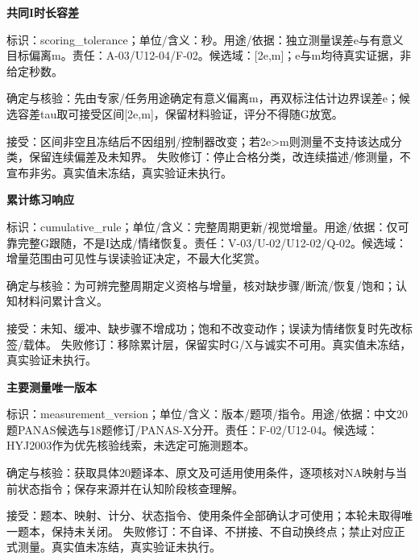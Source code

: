 \documentclass[11pt,a4paper]{article}
\newcommand{\reviewsubsection}[1]{\par\Needspace{4\baselineskip}\begin{center}{\titlelatin\titlecjk\bfseries\fontsize{12}{18}\selectfont #1}\end{center}}
\begin{document}
\begin{minipage}{\linewidth}
\reviewsubsection{8.14 共同I时长容差}
标识：scoring\_\allowbreak{}tolerance；单位/\allowbreak{}含义：秒。用途/\allowbreak{}依据：独立测量误差e与有意义目标偏离m。责任：A-\allowbreak{}03/\allowbreak{}U12-\allowbreak{}04/\allowbreak{}F-\allowbreak{}02。候选域：[2e,m]；e与m均待真实证据，非给定秒数。

确定与核验：先由专家/\allowbreak{}任务用途确定有意义偏离m，再双标注估计边界误差e；候选容差tau取可接受区间[2e,m]，保留材料验证，评分不得随G放宽。

接受：区间非空且冻结后不因组别/\allowbreak{}控制器改变；若2e>m则测量不支持该达成分类，保留连续偏差及未知界。 失败修订：停止合格分类，改连续描述/\allowbreak{}修测量，不宣布非劣。真实值未冻结，真实验证未执行。
\end{minipage}\par

\begin{minipage}{\linewidth}
\reviewsubsection{8.15 累计练习响应}
标识：cumulative\_\allowbreak{}rule；单位/\allowbreak{}含义：完整周期更新/\allowbreak{}视觉增量。用途/\allowbreak{}依据：仅可靠完整G跟随，不是I达成/\allowbreak{}情绪恢复。责任：V-\allowbreak{}03/\allowbreak{}U-\allowbreak{}02/\allowbreak{}U12-\allowbreak{}02/\allowbreak{}Q-\allowbreak{}02。候选域：增量范围由可见性与误读验证决定，不最大化奖赏。

确定与核验：为可辨完整周期定义资格与增量，核对缺步骤/\allowbreak{}断流/\allowbreak{}恢复/\allowbreak{}饱和；认知材料问累计含义。

接受：未知、缓冲、缺步骤不增成功；饱和不改变动作；误读为情绪恢复时先改标签/\allowbreak{}载体。 失败修订：移除累计层，保留实时G/\allowbreak{}X与诚实不可用。真实值未冻结，真实验证未执行。
\end{minipage}\par

\begin{minipage}{\linewidth}
\reviewsubsection{8.16 主要测量唯一版本}
标识：measurement\_\allowbreak{}version；单位/\allowbreak{}含义：版本/\allowbreak{}题项/\allowbreak{}指令。用途/\allowbreak{}依据：中文20题PANAS候选与18题修订/\allowbreak{}PANAS-\allowbreak{}X分开。责任：F-\allowbreak{}02/\allowbreak{}U12-\allowbreak{}04。候选域：HYJ2003作为优先核验线索，未选定可施测题本。

确定与核验：获取具体20题译本、原文及可适用使用条件，逐项核对NA映射与当前状态指令；保存来源并在认知阶段核查理解。

接受：题本、映射、计分、状态指令、使用条件全部确认才可使用；本轮未取得唯一题本，保持未关闭。 失败修订：不自译、不拼接、不自动换终点；禁止对应正式测量。真实值未冻结，真实验证未执行。
\end{minipage}\par
\end{document}
